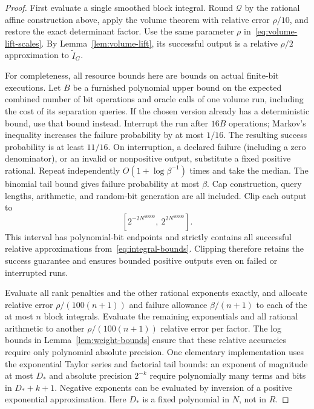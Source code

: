 \begin{proof}
First evaluate a single smoothed block integral. Round $\mathcal Q$
by the rational affine construction above, apply the volume theorem
with relative error $\rho/10$, and restore the exact determinant factor.
Use the same parameter $\rho$ in~\eqref{eq:volume-lift-scales}. By
Lemma~\ref{lem:volume-lift}, its successful output is a relative
$\rho/2$ approximation to $\widetilde I_G$.

For completeness, all resource bounds here are bounds on actual
finite-bit executions. Let $B$ be a furnished polynomial upper bound
on the expected combined number of bit operations and oracle calls
of one volume run, including the cost of its separation queries.
If the chosen version already has a deterministic bound, use that
bound instead. Interrupt the run after $16B$ operations; Markov's
inequality increases the failure probability by at most $1/16$.
The resulting success probability is at least $11/16$. On interruption,
a declared failure (including a zero denominator), or an invalid or
nonpositive output, substitute a fixed positive rational. Repeat independently
$O(1+\log\beta^{-1})$ times and take the median. The binomial tail
bound gives failure probability at most $\beta$. Cap construction,
query lengths, arithmetic, and random-bit generation are all included.
Clip each output to
\[
 [2^{-2N^{50000}},\ 2^{2N^{50000}}].
\]
This interval has polynomial-bit endpoints and strictly contains all
successful relative approximations from~\eqref{eq:integral-bounds}.
Clipping therefore retains the success guarantee and ensures bounded
positive outputs even on failed or interrupted runs.

Evaluate all rank penalties and the other rational exponents exactly,
and allocate relative error $\rho/(100(n+1))$ and failure allowance
$\beta/(n+1)$ to each of the at most $n$ block integrals. Evaluate the
remaining exponentials and all rational arithmetic to another
$\rho/(100(n+1))$ relative error per factor. The log bounds in
Lemma~\ref{lem:weight-bounds} ensure that these relative accuracies
require only polynomial absolute precision. One elementary
implementation uses the exponential Taylor series and factorial tail
bounds: an exponent of magnitude at most $D_*$ and absolute precision
$2^{-k}$ require polynomially many terms and bits in $D_*+k+1$.
Negative exponents can be evaluated by inversion of a positive
exponential approximation. Here $D_*$ is a fixed polynomial in $N$,
not in $R$.


\end{proof}
